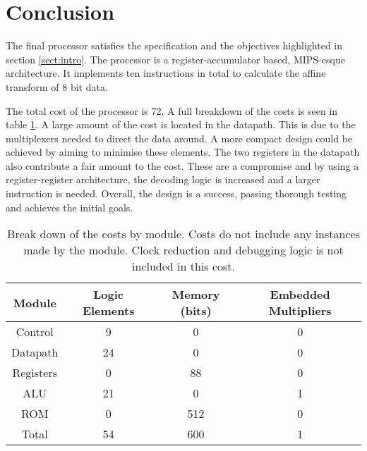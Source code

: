

\section{Conclusion}

The final processor satisfies the specification and the objectives highlighted in section \ref{sect:intro}.
The processor is a register-accumulator based, MIPS-esque architecture. 
It implements ten instructions in total to calculate the affine transform of 8 bit data.

The total cost of the processor is 72.
A full breakdown of the costs is seen in table \ref{tab:costs}.
A large amount of the cost is located in the datapath. 
This is due to the multiplexers needed to direct the data around. 
A more compact design could be achieved by aiming to minimise these elements. 
The two registers in the datapath also contribute a fair amount to the cost. 
These are a compromise and by using a register-register architecture, the decoding logic is increased and a larger instruction is needed.
Overall, the design is a success, passing thorough testing and achieves the initial goals. 


\begin{table}
\caption{Break down of the costs by module. Costs do not include any instances made by the module. Clock reduction and debugging logic is not included in this cost.}
\label{tab:costs}
\begin{tabular}{cccc} \toprule
Module		& Logic Elements	& Memory (bits)	& Embedded Multipliers \\ \midrule
Control		& 9			& 0		& 0	\\
Datapath	& 24			& 0		& 0	\\
Registers	& 0			& 88		& 0	\\
ALU		& 21			& 0		& 1	\\
ROM		& 0			& 512		& 0 	\\ \midrule
Total 		& 54			& 600		& 1 	\\ \bottomrule
\end{tabular}
\end{table}


